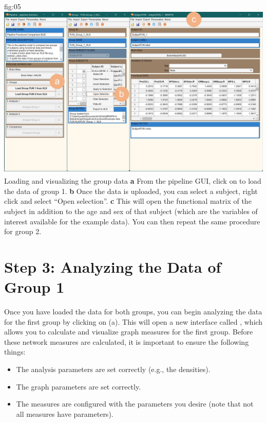 \documentclass[justified]{tufte-handout}
\begin{document}
	{fig:05}
	{
	\includegraphics{fig05.jpg}
	}
	{Loading and visualizing the group data}
	{
	{\bf a} From the pipeline GUI, click on  to load the data of group 1.
	{\bf b} Once the data is uploaded, you can select a subject, right click and select ``Open selection''.
	{\bf c} This will open the functional matrix of the subject in addition to the age and sex of that subject (which are the variables of interest available for the example data).
	You can then repeat the same procedure for group 2.
	}


\clearpage
\section{Step 3: Analyzing the Data of Group 1}

Once you have loaded the data for both groups, you can begin analyzing the data for the first group by clicking on  (a). 
This will open a new interface called , which allows you to calculate and visualize graph measures for the first group. 
Before these network measures are calculated, it is important to ensure the following things: 
\begin{itemize}

\item The analysis parameters are set correctly (e.g., the densities).

\item The graph parameters are set correctly.

\item The measures are configured with the parameters you desire (note that not all measures have parameters).

\end{itemize}
\end{document}
